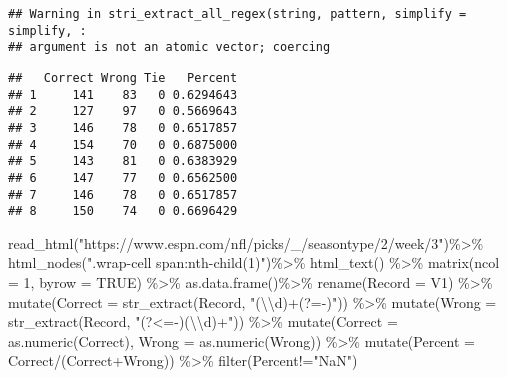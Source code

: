 \documentclass[
]{article}
\newenvironment{Shaded}{\begin{snugshade}}{\end{snugshade}}
\newcommand{\AttributeTok}[1]{\textcolor[rgb]{0.77,0.63,0.00}{#1}}
\newcommand{\ConstantTok}[1]{\textcolor[rgb]{0.00,0.00,0.00}{#1}}
\newcommand{\DecValTok}[1]{\textcolor[rgb]{0.00,0.00,0.81}{#1}}
\newcommand{\FunctionTok}[1]{\textcolor[rgb]{0.00,0.00,0.00}{#1}}
\newcommand{\NormalTok}[1]{#1}
\newcommand{\OtherTok}[1]{\textcolor[rgb]{0.56,0.35,0.01}{#1}}
\newcommand{\SpecialCharTok}[1]{\textcolor[rgb]{0.00,0.00,0.00}{#1}}
\newcommand{\StringTok}[1]{\textcolor[rgb]{0.31,0.60,0.02}{#1}}
\begin{document}
\begin{verbatim}
## Warning in stri_extract_all_regex(string, pattern, simplify = simplify, :
## argument is not an atomic vector; coercing
\end{verbatim}

\begin{verbatim}
##   Correct Wrong Tie   Percent
## 1     141    83   0 0.6294643
## 2     127    97   0 0.5669643
## 3     146    78   0 0.6517857
## 4     154    70   0 0.6875000
## 5     143    81   0 0.6383929
## 6     147    77   0 0.6562500
## 7     146    78   0 0.6517857
## 8     150    74   0 0.6696429
\end{verbatim}

\begin{Shaded}
\begin{Highlighting}[]
\FunctionTok{read\_html}\NormalTok{(}\StringTok{"https://www.espn.com/nfl/picks/\_/seasontype/2/week/3"}\NormalTok{)}\SpecialCharTok{\%\textgreater{}\%}
    \FunctionTok{html\_nodes}\NormalTok{(}\StringTok{".wrap{-}cell span:nth{-}child(1)"}\NormalTok{)}\SpecialCharTok{\%\textgreater{}\%}
    \FunctionTok{html\_text}\NormalTok{() }\SpecialCharTok{\%\textgreater{}\%} 
    \FunctionTok{matrix}\NormalTok{(}\AttributeTok{ncol =} \DecValTok{1}\NormalTok{, }\AttributeTok{byrow =} \ConstantTok{TRUE}\NormalTok{) }\SpecialCharTok{\%\textgreater{}\%}
    \FunctionTok{as.data.frame}\NormalTok{()}\SpecialCharTok{\%\textgreater{}\%}
    \FunctionTok{rename}\NormalTok{(}\StringTok{\textasciigrave{}}\AttributeTok{Record}\StringTok{\textasciigrave{}} \OtherTok{=}\NormalTok{ V1) }\SpecialCharTok{\%\textgreater{}\%} 
    \FunctionTok{mutate}\NormalTok{(}\AttributeTok{Correct =} \FunctionTok{str\_extract}\NormalTok{(Record, }\StringTok{"(}\SpecialCharTok{\textbackslash{}\textbackslash{}}\StringTok{d)+(?={-})"}\NormalTok{)) }\SpecialCharTok{\%\textgreater{}\%} 
    \FunctionTok{mutate}\NormalTok{(}\AttributeTok{Wrong =} \FunctionTok{str\_extract}\NormalTok{(Record, }\StringTok{"(?\textless{}={-})(}\SpecialCharTok{\textbackslash{}\textbackslash{}}\StringTok{d)+"}\NormalTok{)) }\SpecialCharTok{\%\textgreater{}\%} 
    \FunctionTok{mutate}\NormalTok{(}\AttributeTok{Correct =} \FunctionTok{as.numeric}\NormalTok{(Correct), }\AttributeTok{Wrong =} \FunctionTok{as.numeric}\NormalTok{(Wrong)) }\SpecialCharTok{\%\textgreater{}\%} 
    \FunctionTok{mutate}\NormalTok{(}\AttributeTok{Percent =}\NormalTok{ Correct}\SpecialCharTok{/}\NormalTok{(Correct}\SpecialCharTok{+}\NormalTok{Wrong)) }\SpecialCharTok{\%\textgreater{}\%} 
    \FunctionTok{filter}\NormalTok{(Percent}\SpecialCharTok{!=}\StringTok{"NaN"}\NormalTok{)}
\end{Highlighting}
\end{Shaded}
\end{document}
